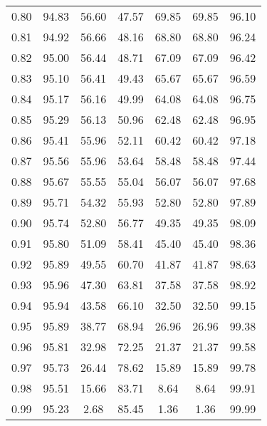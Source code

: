 \begin{tabular}{|c|c|c|c|c|c|c|}
      0.80 &     94.83 &     56.60 &      47.57 &   69.85 &      69.85 &         96.10 \\
      0.81 &     94.92 &     56.66 &      48.16 &   68.80 &      68.80 &         96.24 \\
      0.82 &     95.00 &     56.44 &      48.71 &   67.09 &      67.09 &         96.42 \\
      0.83 &     95.10 &     56.41 &      49.43 &   65.67 &      65.67 &         96.59 \\
      0.84 &     95.17 &     56.16 &      49.99 &   64.08 &      64.08 &         96.75 \\
      0.85 &     95.29 &     56.13 &      50.96 &   62.48 &      62.48 &         96.95 \\
      0.86 &     95.41 &     55.96 &      52.11 &   60.42 &      60.42 &         97.18 \\
      0.87 &     95.56 &     55.96 &      53.64 &   58.48 &      58.48 &         97.44 \\
      0.88 &     95.67 &     55.55 &      55.04 &   56.07 &      56.07 &         97.68 \\
      0.89 &     95.71 &     54.32 &      55.93 &   52.80 &      52.80 &         97.89 \\
      0.90 &     95.74 &     52.80 &      56.77 &   49.35 &      49.35 &         98.09 \\
      0.91 &     95.80 &     51.09 &      58.41 &   45.40 &      45.40 &         98.36 \\
      0.92 &     95.89 &     49.55 &      60.70 &   41.87 &      41.87 &         98.63 \\
      0.93 &     95.96 &     47.30 &      63.81 &   37.58 &      37.58 &         98.92 \\
      0.94 &     95.94 &     43.58 &      66.10 &   32.50 &      32.50 &         99.15 \\
      0.95 &     95.89 &     38.77 &      68.94 &   26.96 &      26.96 &         99.38 \\
      0.96 &     95.81 &     32.98 &      72.25 &   21.37 &      21.37 &         99.58 \\
      0.97 &     95.73 &     26.44 &      78.62 &   15.89 &      15.89 &         99.78 \\
      0.98 &     95.51 &     15.66 &      83.71 &    8.64 &       8.64 &         99.91 \\
      0.99 &     95.23 &      2.68 &      85.45 &    1.36 &       1.36 &         99.99 \\
\bottomrule
\end{tabular}
